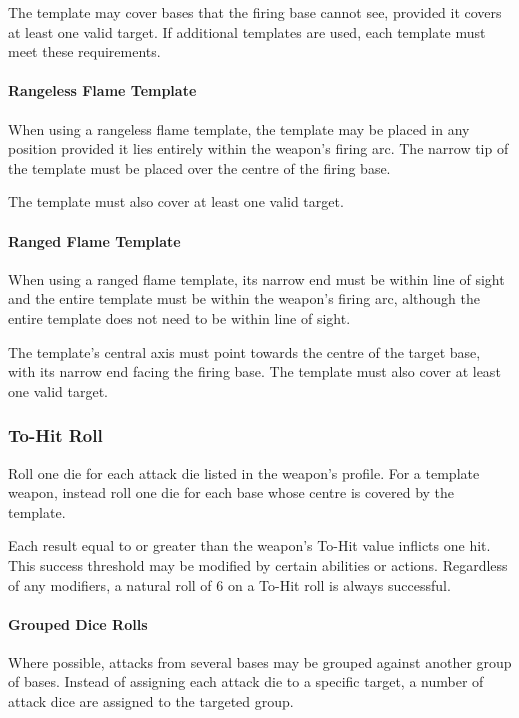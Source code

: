 The template may cover bases that the firing base cannot see, provided it covers at least one valid target. If additional templates are used, each template must meet these requirements.

\paragraph{Rangeless Flame Template}

When using a rangeless flame template, the template may be placed in any position provided it lies entirely within the weapon's firing arc. The narrow tip of the template must be placed over the centre of the firing base.

The template must also cover at least one valid target.

\paragraph{Ranged Flame Template}

When using a ranged flame template, its narrow end must be within line of sight and the entire template must be within the weapon's firing arc, although the entire template does not need to be within line of sight.

The template's central axis must point towards the centre of the target base, with its narrow end facing the firing base. The template must also cover at least one valid target.

\subsubsection{To-Hit Roll}

Roll one die for each attack die listed in the weapon's profile. For a template weapon, instead roll one die for each base whose centre is covered by the template.

Each result equal to or greater than the weapon's To-Hit value inflicts one hit. This success threshold may be modified by certain abilities or actions. Regardless of any modifiers, a natural roll of 6 on a To-Hit roll is always successful.

\paragraph{Grouped Dice Rolls}

Where possible, attacks from several bases may be grouped against another group of bases. Instead of assigning each attack die to a specific target, a number of attack dice are assigned to the targeted group.

